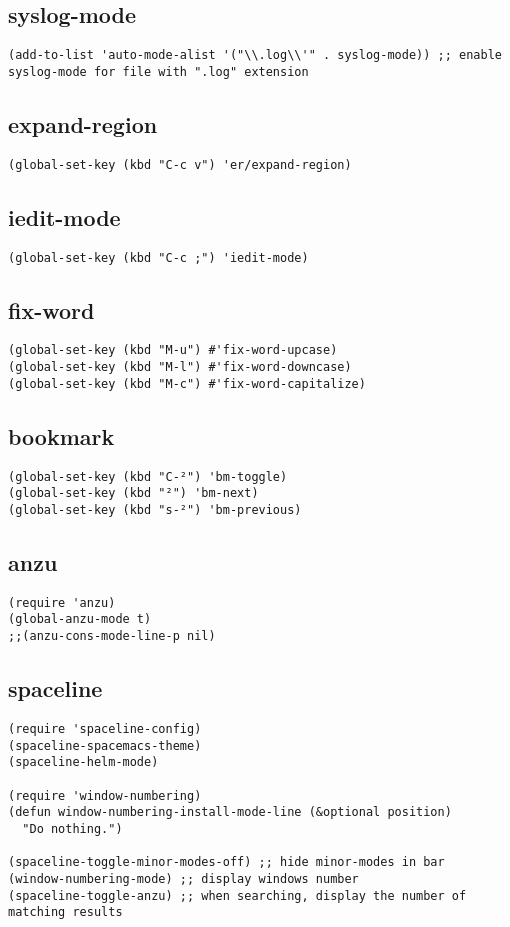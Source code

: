 \documentclass[11pt]{article}
\begin{document}
\subsection{syslog-mode}
\label{sec-2-12}
\begin{verbatim}
(add-to-list 'auto-mode-alist '("\\.log\\'" . syslog-mode)) ;; enable syslog-mode for file with ".log" extension
\end{verbatim}
\subsection{expand-region}
\label{sec-2-13}
\begin{verbatim}
(global-set-key (kbd "C-c v") 'er/expand-region)
\end{verbatim}
\subsection{iedit-mode}
\label{sec-2-14}
\begin{verbatim}
(global-set-key (kbd "C-c ;") 'iedit-mode)
\end{verbatim}
\subsection{fix-word}
\label{sec-2-15}
\begin{verbatim}
(global-set-key (kbd "M-u") #'fix-word-upcase)
(global-set-key (kbd "M-l") #'fix-word-downcase)
(global-set-key (kbd "M-c") #'fix-word-capitalize)
\end{verbatim}
\subsection{bookmark}
\label{sec-2-16}
\begin{verbatim}
(global-set-key (kbd "C-²") 'bm-toggle)
(global-set-key (kbd "²") 'bm-next)
(global-set-key (kbd "s-²") 'bm-previous)
\end{verbatim}
\subsection{anzu}
\label{sec-2-17}
\begin{verbatim}
(require 'anzu)
(global-anzu-mode t)
;;(anzu-cons-mode-line-p nil)
\end{verbatim}
\subsection{spaceline}
\label{sec-2-18}
\begin{verbatim}
(require 'spaceline-config)
(spaceline-spacemacs-theme)
(spaceline-helm-mode)

(require 'window-numbering)
(defun window-numbering-install-mode-line (&optional position)
  "Do nothing.")

(spaceline-toggle-minor-modes-off) ;; hide minor-modes in bar
(window-numbering-mode) ;; display windows number
(spaceline-toggle-anzu) ;; when searching, display the number of matching results
\end{verbatim}
\end{document}
